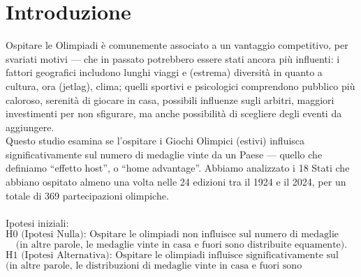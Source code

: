 \section{Introduzione}\label{sec:intro}

Ospitare le Olimpiadi è comunemente associato a un vantaggio competitivo, per
svariati motivi --- che in passato potrebbero essere stati ancora più influenti:
i fattori geografici includono lunghi viaggi e (estrema) diversità in quanto a
cultura, ora (jetlag), clima; quelli sportivi e psicologici comprendono pubblico
più caloroso, serenità di giocare in casa, possibili influenze sugli arbitri,
maggiori investimenti per non sfigurare, ma anche possibilità di scegliere degli
eventi da aggiungere.\\
Questo studio esamina se l'ospitare i Giochi Olimpici (estivi) influisca
significativamente sul numero di medaglie vinte da un Paese --- quello che
definiamo ``effetto host'', o ``home advantage''. Abbiamo analizzato i 18 Stati
che abbiano ospitato almeno una volta nelle 24 edizioni tra il 1924 e il 2024,
per un totale di 369 partecipazioni olimpiche.\\ 
\\
Ipotesi iniziali:
\[
	\text{H0 (Ipotesi Nulla): Ospitare le olimpiadi non influisce sul numero di medaglie
	vinte da un paese}
\]
\[
	\text{(in altre parole, le medaglie vinte in casa e fuori sono distribuite equamente).}
\]
\[
	\text{H1 (Ipotesi Alternativa): Ospitare le olimpiadi influisce significativamente sul
	numero di medaglie vinte}
\]
\[
	\text{(in altre parole, le distribuzioni di medaglie vinte in casa e fuori sono significativamente diverse).}
\]